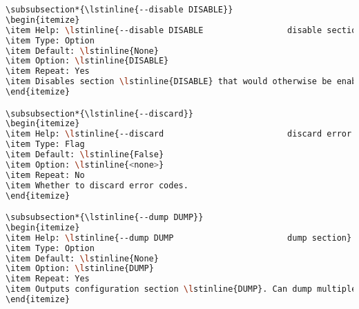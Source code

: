 \begin{snugshade}
\begin{lstlisting}[language=bash]
\subsubsection*{\lstinline{--disable DISABLE}}
\begin{itemize}
\item Help: \lstinline{--disable DISABLE                 disable section}
\item Type: Option
\item Default: \lstinline{None}
\item Option: \lstinline{DISABLE}
\item Repeat: Yes
\item Disables section \lstinline{DISABLE} that would otherwise be enabled by configuration file or command line option. Takes precedence over all other means of enabling sections.
\end{itemize}

\subsubsection*{\lstinline{--discard}}
\begin{itemize}
\item Help: \lstinline{--discard                         discard error codes}
\item Type: Flag
\item Default: \lstinline{False}
\item Option: \lstinline{<none>}
\item Repeat: No
\item Whether to discard error codes.
\end{itemize}

\subsubsection*{\lstinline{--dump DUMP}}
\begin{itemize}
\item Help: \lstinline{--dump DUMP                       dump section}
\item Type: Option
\item Default: \lstinline{None}
\item Option: \lstinline{DUMP}
\item Repeat: Yes
\item Outputs configuration section \lstinline{DUMP}. Can dump multiple configuration sections. Can be used to remember how command substitutions will be generated.
\end{itemize}


\end{lstlisting}
\end{snugshade}
